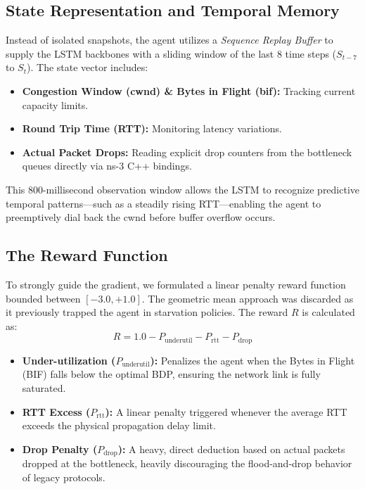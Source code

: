 \documentclass[12pt, a4paper]{article}
\begin{document}
\subsection{State Representation and Temporal Memory}
Instead of isolated snapshots, the agent utilizes a \textit{Sequence Replay Buffer} to supply the LSTM backbones with a sliding window of the last 8 time steps ($S_{t-7}$ to $S_t$). The state vector includes:
\begin{itemize}
    \item \textbf{Congestion Window (cwnd) \& Bytes in Flight (bif):} Tracking current capacity limits.
    \item \textbf{Round Trip Time (RTT):} Monitoring latency variations.
    \item \textbf{Actual Packet Drops:} Reading explicit drop counters from the bottleneck queues directly via ns-3 C++ bindings.
\end{itemize}
This 800-millisecond observation window allows the LSTM to recognize predictive temporal patterns---such as a steadily rising RTT---enabling the agent to preemptively dial back the cwnd before buffer overflow occurs.

\subsection{The Reward Function}
To strongly guide the gradient, we formulated a linear penalty reward function bounded between $[-3.0, +1.0]$. The geometric mean approach was discarded as it previously trapped the agent in starvation policies. The reward $R$ is calculated as:
\begin{equation}
    R = 1.0 - P_{\text{underutil}} - P_{\text{rtt}} - P_{\text{drop}}
\end{equation}
\begin{itemize}
    \item \textbf{Under-utilization ($P_{\text{underutil}}$):} Penalizes the agent when the Bytes in Flight (BIF) falls below the optimal BDP, ensuring the network link is fully saturated.
    \item \textbf{RTT Excess ($P_{\text{rtt}}$):} A linear penalty triggered whenever the average RTT exceeds the physical propagation delay limit.
    \item \textbf{Drop Penalty ($P_{\text{drop}}$):} A heavy, direct deduction based on actual packets dropped at the bottleneck, heavily discouraging the flood-and-drop behavior of legacy protocols.
\end{itemize}
\end{document}
